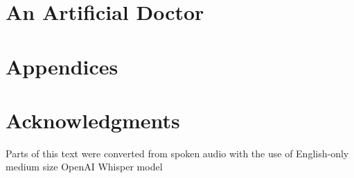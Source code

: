 \newpage
\chapter{An Artificial Doctor} \label{ch:mimicseq}
%

\newpage
\chapter{Appendices}





\newpage
\chapter{Acknowledgments}

Parts of this text were converted from spoken audio with the use of English-only medium size OpenAI Whisper model \cite{radfordRobustSpeechRecognition2022}

\printbibliography


